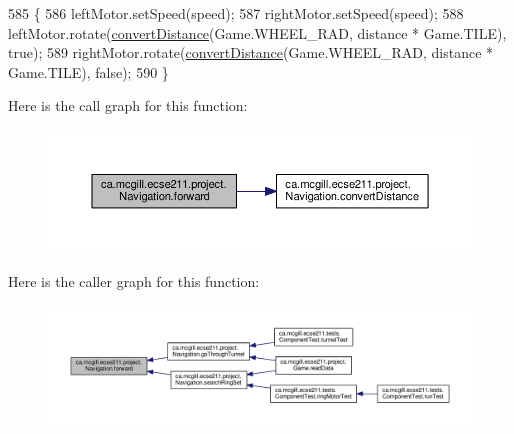 \begin{DoxyCode}
585                                                   \{
586     leftMotor.setSpeed(speed);
587     rightMotor.setSpeed(speed);
588     leftMotor.rotate(\hyperlink{classca_1_1mcgill_1_1ecse211_1_1project_1_1_navigation_ac9e260bcd619ffa4820d7d0de7ea1c12}{convertDistance}(Game.WHEEL\_RAD, distance * Game.TILE), \textcolor{keyword}{true});
589     rightMotor.rotate(\hyperlink{classca_1_1mcgill_1_1ecse211_1_1project_1_1_navigation_ac9e260bcd619ffa4820d7d0de7ea1c12}{convertDistance}(Game.WHEEL\_RAD, distance * Game.TILE), \textcolor{keyword}{false});
590   \}
\end{DoxyCode}
Here is the call graph for this function\+:\nopagebreak
\begin{figure}[H]
\begin{center}
\leavevmode
\includegraphics[width=350pt]{classca_1_1mcgill_1_1ecse211_1_1project_1_1_navigation_a7c66610c5b7496ddb35d342ab2cd3f08_cgraph}
\end{center}
\end{figure}
Here is the caller graph for this function\+:\nopagebreak
\begin{figure}[H]
\begin{center}
\leavevmode
\includegraphics[width=350pt]{classca_1_1mcgill_1_1ecse211_1_1project_1_1_navigation_a7c66610c5b7496ddb35d342ab2cd3f08_icgraph}
\end{center}
\end{figure}
\mbox{\label{classca_1_1mcgill_1_1ecse211_1_1project_1_1_navigation_a4b52e605d3ea2f9bcd9481ae2c69ba39}} 
